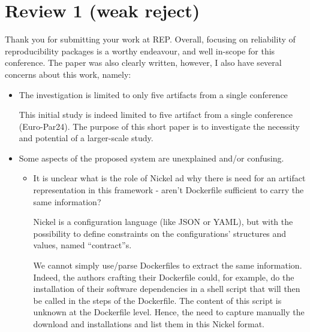 \documentclass[%
	11pt,
	final,
]{article}
\begin{document}

\section{Review 1 (weak reject)}

Thank you for submitting your work at REP. Overall, focusing on reliability of reproducibility packages is a worthy endeavour, and well in-scope for this conference. The paper was also clearly written, however, I also have several concerns about this work, namely:


\begin{itemize}
\item The investigation is limited to only five artifacts from a single conference

\begin{review-answer}
  This initial study is indeed limited to five artifact from a single conference (Euro-Par24).
  The purpose of this short paper is to investigate the necessity and potential of a larger-scale study.
\end{review-answer}

\item Some aspects of the proposed system are unexplained and/or confusing.
  \begin{itemize}
   \item It is unclear what is the role of Nickel ad why there is need for an artifact representation in this framework - aren't Dockerfile sufficient to carry the same information?
\begin{review-answer}
  Nickel is a configuration language (like JSON or YAML), but with the possibility to define constraints on the configurations' structures and values, named ``contract''s.

  We cannot simply use/parse Dockerfiles to extract the same information.
  Indeed, the authors crafting their Dockerfile could, for example, do the installation of their software dependencies in a shell script that will then be called in the steps of the Dockerfile.
  The content of this script is unknown at the Dockerfile level.
  Hence, the need to capture manually the download and installations and list them in this Nickel format.
  

\end{review-answer}
\end{itemize}
\end{itemize}
\end{document}

